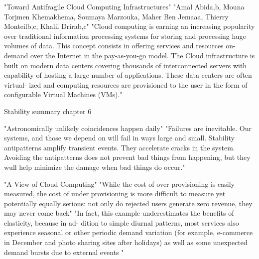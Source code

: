 {"Toward Antifragile Cloud Computing Infrastructures" "Amal Abida,b, Mouna Torjmen Khemakhema, Soumaya Marzouka, Maher Ben Jemaaa, Thierry Monteilb,c, Khalil Drirab,c"
"Cloud computing is earning an increasing popularity over traditional information processing systems for storing and processing huge volumes of data. This concept consists in offering services and resources on-demand over the Internet in the pay-as-you-go model. The Cloud infrastructure is built on modern data centers covering thousands of interconnected servers with capability of hosting a large number of applications. These data centers are often virtual- ized and computing resources are provisioned to the user in the form of configurable Virtual Machines (VMs)."



Stability summary chapter 6 \cite[p. 117]{nygard2007release}

"Astronomically unlikely coincidences happen daily"
"Failures are inevitable. Our systems, and those we depend on will fail in ways large and small. Stability antipatterns amplify transient events. They accelerate cracks in the system. Avoiding the antipatterns does not prevent bad things from happening, but they wull help minimize the damage when bad things do occur."


"A View of Cloud Computing"
"While the cost of over provisioning is easily measured, the cost of under provisioning is more difficult to measure yet potentially equally serious: not only do rejected users generate zero revenue, they may never come back"
"In fact, this example underestimates the benefits of elasticity, because in ad- dition to simple diurnal patterns, most services also experience seasonal or other periodic demand variation (for example, e-commerce in December and photo sharing sites after holidays) as well as some unexpected demand bursts due to external events "
}







